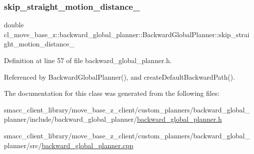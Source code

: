 \subsubsection{\texorpdfstring{skip\+\_\+straight\+\_\+motion\+\_\+distance\+\_\+}{skip\_straight\_motion\_distance\_}}
{\footnotesize\ttfamily double cl\+\_\+move\+\_\+base\+\_\+z\+::backward\+\_\+global\+\_\+planner\+::\+Backward\+Global\+Planner\+::skip\+\_\+straight\+\_\+motion\+\_\+distance\+\_\+\hspace{0.3cm}{\ttfamily [private]}}



Definition at line 57 of file backward\+\_\+global\+\_\+planner.\+h.



Referenced by Backward\+Global\+Planner(), and create\+Default\+Backward\+Path().



The documentation for this class was generated from the following files\+:\begin{DoxyCompactItemize}
\item 
smacc\+\_\+client\+\_\+library/move\+\_\+base\+\_\+z\+\_\+client/custom\+\_\+planners/backward\+\_\+global\+\_\+planner/include/backward\+\_\+global\+\_\+planner/\hyperlink{backward__global__planner_8h}{backward\+\_\+global\+\_\+planner.\+h}\item 
smacc\+\_\+client\+\_\+library/move\+\_\+base\+\_\+z\+\_\+client/custom\+\_\+planners/backward\+\_\+global\+\_\+planner/src/\hyperlink{backward__global__planner_8cpp}{backward\+\_\+global\+\_\+planner.\+cpp}\end{DoxyCompactItemize}
